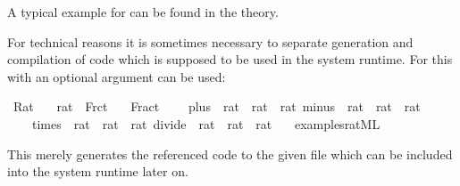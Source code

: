 \begin{isabellebody}
\begin{isamarkuptext}
  A typical example for \hyperlink{command.code-reflect}{\mbox{}} can be found in the
  \hyperlink{theory.Predicate}{\mbox{}} theory.%
\end{isamarkuptext}%
\isamarkuptrue%
%
\isamarkuptrue%
%
\begin{isamarkuptext}%
For technical reasons it is sometimes necessary to separate
  generation and compilation of code which is supposed to be used in
  the system runtime.  For this \hyperlink{command.code-reflect}{\mbox{}} with an
  optional  argument can be used:%
\end{isamarkuptext}%
\isamarkuptrue%
%
\isadelimquote
%
\endisadelimquote
%
\isatagquote
{}\isamarkupfalse%
\ Rat\isanewline
\ \ \ rat\ {\isacharequal}\ Frct\isanewline
\ \ \ Fract\isanewline
\ \ \ \ {\isachardoublequoteopen}{\isacharparenleft}plus\ {\isacharcolon}{\isacharcolon}\ rat\ {\isasymRightarrow}\ rat\ {\isasymRightarrow}\ rat{\isacharparenright}{\isachardoublequoteclose}\ {\isachardoublequoteopen}{\isacharparenleft}minus\ {\isacharcolon}{\isacharcolon}\ rat\ {\isasymRightarrow}\ rat\ {\isasymRightarrow}\ rat{\isacharparenright}{\isachardoublequoteclose}\isanewline
\ \ \ \ {\isachardoublequoteopen}{\isacharparenleft}times\ {\isacharcolon}{\isacharcolon}\ rat\ {\isasymRightarrow}\ rat\ {\isasymRightarrow}\ rat{\isacharparenright}{\isachardoublequoteclose}\ {\isachardoublequoteopen}{\isacharparenleft}divide\ {\isacharcolon}{\isacharcolon}\ rat\ {\isasymRightarrow}\ rat\ {\isasymRightarrow}\ rat{\isacharparenright}{\isachardoublequoteclose}\isanewline
\ \ \ {\isachardoublequoteopen}examples{\isacharslash}rat{\isachardot}ML{\isachardoublequoteclose}%
\endisatagquote
{\isafoldquote}%
%
\isadelimquote
%
\endisadelimquote
%
\begin{isamarkuptext}%
\noindent This merely generates the referenced code to the given
  file which can be included into the system runtime later on.%
\end{isamarkuptext}%
\isamarkuptrue%
%
\isadelimtheory
%
\endisadelimtheory
%
\isatagtheory
{}\isamarkupfalse%
%
\endisatagtheory
{\isafoldtheory}%
%
\isadelimtheory
%
\endisadelimtheory
\isanewline
\end{isabellebody}%
